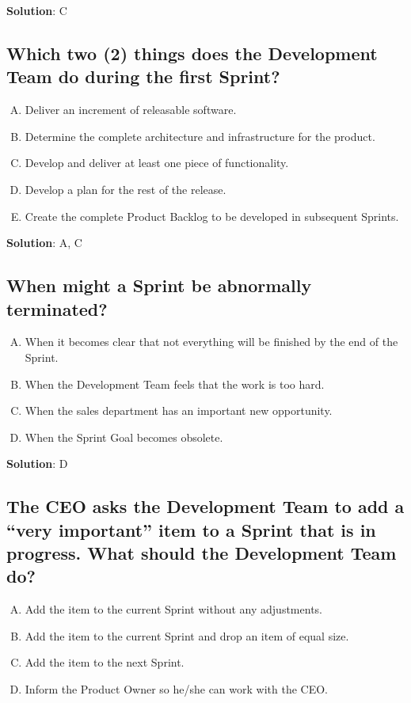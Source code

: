 \textbf{Solution}: C


\subsection{Which two (2) things does the Development Team do during the first Sprint?}
\begin{enumerate}[A)]
  \item Deliver an increment of releasable software.
  \item Determine the complete architecture and infrastructure for the product.
  \item Develop and deliver at least one piece of functionality.
  \item Develop a plan for the rest of the release.
  \item Create the complete Product Backlog to be developed in subsequent Sprints.
\end{enumerate}


\textbf{Solution}: A, C


\subsection{When might a Sprint be abnormally terminated?}
\begin{enumerate}[A)]
  \item When it becomes clear that not everything will be finished by the end of the Sprint.
  \item When the Development Team feels that the work is too hard.
  \item When the sales department has an important new opportunity.
  \item When the Sprint Goal becomes obsolete.
\end{enumerate}


\textbf{Solution}: D


\subsection{The CEO asks the Development Team to add a \enquote{very important} item to a Sprint that is in progress. What should the Development Team do?}
\begin{enumerate}[A)]
  \item Add the item to the current Sprint without any adjustments.
  \item Add the item to the current Sprint and drop an item of equal size.
  \item Add the item to the next Sprint.
  \item Inform the Product Owner so he/she can work with the CEO.
\end{enumerate}


